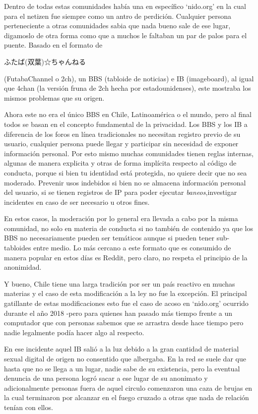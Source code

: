 \documentclass[11pt]{utalcaDoc}
\begin{document}
Dentro de todas estas comunidades había una en específico `nido.org' en la cual para el netizen fue siempre como un antro de perdición. Cualquier persona perteneciente a otras comunidades sabia que nada bueno sale de ese lugar, digamoslo de otra forma como que a muchos le faltaban un par de palos para el puente. Basado en el formato de \begin{CJK}{UTF8}{min}ふたば(双葉)☆ちゃんねる\end{CJK} (FutabaChannel o 2ch), un BBS (tabloide de noticias) e IB (imageboard), al igual que 4chan (la versión fruna de 2ch hecha por estadounidenses), este mostraba los mismos problemas que su origen.

Ahora este no era el único BBS en Chile, Latinoamérica o el mundo, pero al final todos se basan en el concepto fundamental de la privacidad. Los BBS y los IB a diferencia de los foros en línea tradicionales no necesitan registro previo de su usuario, cualquier persona puede llegar y participar sin necesidad de exponer información personal. Por esto mismo muchas comunidades tienen reglas internas, algunas de manera explicita y otras de forma implícita respecto al código de conducta, porque si bien tu identidad está protegida, no quiere decir que no sea moderado. Prevenir usos indebidos si bien no se almacena información personal del usuario, si se tienen registros de IP para poder ejecutar \textit{baneos},investigar incidentes en caso de ser necesario u otros fines.

En estos casos, la moderación por lo general era llevada a cabo por la misma comunidad, no solo en materia de conducta si no también de contenido ya que los BBS no necesariamente pueden ser temáticos aunque si pueden tener sub-tabloides entre medio. Lo más cercano a este formato que es consumido de manera popular en estos días es Reddit, pero claro, no respeta el principio de la anonimidad.

Y bueno, Chile tiene una larga tradición por ser un país reactivo en muchas materias y el caso de esta modificación a la ley no fue la excepción. El principal gatillante de estas modificaciones esto fue el caso de acoso en `nido.org' ocurrido durante el año 2018 -pero para quienes han pasado más tiempo frente a un computador que con personas sabemos que se arrastra desde hace tiempo pero nadie legalmente podía hacer algo al respecto.

En ese incidente aquel IB salió a la luz debido a la gran cantidad de material sexual digital de origen no consentido que albergaba. En la red se suele dar que hasta que no se llega a un lugar, nadie sabe de su existencia, pero la eventual denuncia de una persona logró sacar a ese lugar de su anonimato y adicionalmente personas fuera de aquel circulo comenzaron una caza de brujas en la cual terminaron por alcanzar en el fuego cruzado a otras que nada de relación tenían con ellos.
\end{document}
